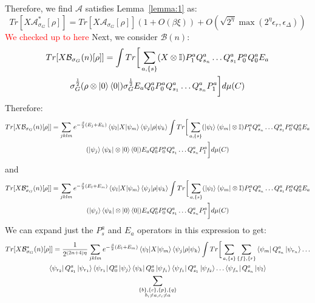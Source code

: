 \documentclass[aps,floatfix,10pt,amssymb,amsfont,amsmath,superscriptaddress,float,nofootinbib,longbibliography,nobalancelastpage,twocolumn]{revtex4-2}
\begin{document}
\begin{widetext}
Therefore, we find $\mathcal{A}$ satisfies Lemma~\ref{lemma:1} as:
\begin{equation}
    Tr\left[X\mathcal{A}^*_{\sigma_G}[\rho]\right] = Tr\left[X\mathcal{A}_{\sigma_G}[\rho]\right](1+O(\beta\xi)) + O(\sqrt{2^{\eta}}\max(2^{\eta}\epsilon_r,\epsilon_\Delta))
\end{equation}
\textcolor{red}{We checked up to here} 
Next, we consider $\mathcal{B}(n)$:
\begin{multline}
    Tr[X\mathcal{B}_{\sigma_G}(n)[\rho]] = \int Tr\bigg[ \sum_{a,\{s\}}(X\otimes \mathbb{I})P^a_1Q^a_{s_n}\ldots Q^a_{s_1}P^a_0Q^a_0E_a \\\sigma_G^{\frac{1}{2}}(\rho\otimes \ket{0}\bra{0})\sigma_G^{\frac{1}{2}}  E_aQ^a_0P^a_0Q^a_{s_1}\ldots Q^a_{s_n}P^a_1\bigg]d\mu(C)
\end{multline}
Therefore:
\begin{multline}
    Tr[X\mathcal{B}_{\sigma_G}(n)[\rho]] = \sum_{jklm}e^{-\frac{\beta}{2}(E_j+E_k)}\braket{\psi_l|X|\psi_m}\braket{\psi_j|\rho|\psi_k}\int Tr\bigg[ \sum_{a,\{s\}}(\ket{\psi_l}\bra{\psi_m}\otimes \mathbb{I})P^a_1Q^a_{s_n}\ldots Q^a_{s_1}P^a_0Q^a_0E_a \\(\ket{\psi_j}\bra{\psi_k}\otimes \ket{0}\bra{0})  E_aQ^a_0P^a_0Q^a_{s_1}\ldots Q^a_{s_n}P^a_1\bigg]d\mu(C)
\end{multline}
and
\begin{multline}
    Tr[X\mathcal{B}^*_{\sigma_G}(n)[\rho]] = \sum_{jklm}e^{-\frac{\beta}{2}(E_l+E_m)}\braket{\psi_l|X|\psi_m}\braket{\psi_j|\rho|\psi_k}\int Tr\bigg[ \sum_{a,\{s\}}(\ket{\psi_l}\bra{\psi_m}\otimes \mathbb{I})P^a_1Q^a_{s_n}\ldots Q^a_{s_1}P^a_0Q^a_0E_a \\(\ket{\psi_j}\bra{\psi_k}\otimes \ket{0}\bra{0})  E_aQ^a_0P^a_0Q^a_{s_1}\ldots Q^a_{s_n}P^a_1\bigg]d\mu(C)
\end{multline}
We can expand just the $P_s^a$ and $E_a$ operators in this expression to get:
\begin{multline}
    Tr[X\mathcal{B}^*_{\sigma_G}(n)[\rho]] = \frac{1}{2^{(2n+4)\eta}}\sum_{jklm}e^{-\frac{\beta}{2}(E_l+E_m)}\braket{\psi_l|X|\psi_m}\braket{\psi_j|\rho|\psi_k}\int Tr\bigg[ \sum_{a,\{s\}}\sum_{\{f\}, \{r\}}\bra{\psi_m}Q^a_{s_n}\ket{\psi_{r_{n}}}\ldots \\\bra{\psi_{r_2}}Q^a_{s_1}\ket{\psi_{r_1}}\bra{\psi_{r_1}}Q^a_0\ket{\psi_j}
\bra{\psi_k}Q^a_0\ket{\psi_{f_1}}\bra{\psi_{f_1}}Q^a_{s_1}\ket{\psi_{f_2}}\ldots \bra{\psi_{f_{n}}}Q^a_{s_n}\ket{\psi_l}\\
\sum_{\substack{\{b\}, \{c\}, \{p\}, \{q\}\\b_i\neq a, c_i\neq a}}

\end{multline}
\end{widetext}
\end{document}
